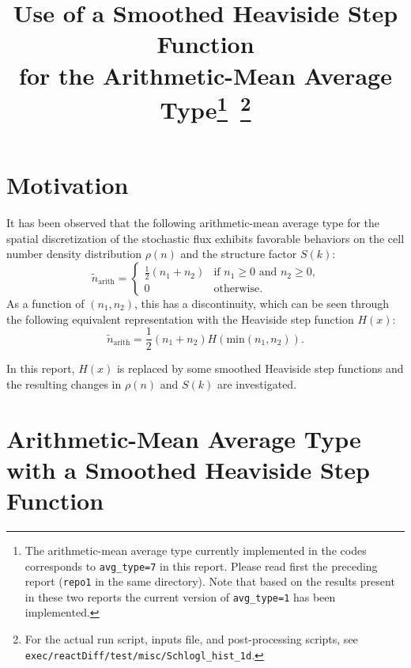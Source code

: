 \documentclass{article}
\begin{document}
\title{Use of a Smoothed Heaviside Step Function \\ for the Arithmetic-Mean Average Type\footnote{The arithmetic-mean average type currently implemented in the codes corresponds to \texttt{avg\_type=7} in this report. Please read first the preceding report (\texttt{repo1} in the same directory). Note that based on the results present in these two reports the current version of \texttt{avg\_type=1} has been implemented.}~\footnote{For the actual run script, inputs file, and post-processing scripts, see \texttt{exec/reactDiff/test/misc/Schlogl\_hist\_1d}.}}

\date{}

\maketitle

\section{Motivation}

It has been observed that the following arithmetic-mean average type for the spatial discretization of the stochastic flux exhibits favorable behaviors on the cell number density distribution $\rho(n)$ and the structure factor $S(k)$:
\begin{equation}
\tilde{n}_\mathrm{arith}=
\begin{cases} 
\frac12(n_1+n_2) & \mbox{if $n_1\ge0$ and $n_2\ge0$,} \\ 
0 & \mbox{otherwise.}
\end{cases}
\end{equation}
As a function of $(n_1,n_2)$, this has a discontinuity, which can be seen through the following equivalent representation with the Heaviside step function $H(x)$:
\begin{equation}
\tilde{n}_\mathrm{arith} = \frac{1}{2}(n_1+n_2)H(\mathrm{min}(n_1,n_2)).
\end{equation}

In this report, $H(x)$ is replaced by some smoothed Heaviside step functions and the resulting changes in $\rho(n)$ and $S(k)$ are investigated.

\section{Arithmetic-Mean Average Type with a Smoothed Heaviside Step Function} 
\end{document}
